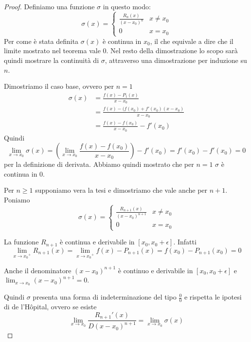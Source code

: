 \begin{proof}
Definiamo una funzione $\sigma$ in questo modo:
\begin{equation*}
\sigma(x) = \begin{cases}
\frac{R_n(x)}{(x-x_0)^n} & x \neq x_0 \\
0 & x = x_0
\end{cases}
\end{equation*}
Per come è stata definita $\sigma(x)$ è continua in $x_0$, il che equivale a dire che il limite mostrato nel teorema vale 0. Nel resto della dimostrazione lo scopo sarà quindi mostrare la continuità di $\sigma$, attraverso una dimostrazione per induzione su $n$.

Dimostriamo il caso base, ovvero per $n = 1$
\begin{align*}
\sigma(x) &= \frac{f(x)-P_1(x)}{x-x_0} \\
&= \frac{f(x)-(f(x_0)+f'(x_0)(x-x_0)}{x-x_0} \\
&= \frac{f(x)-f(x_0)}{x-x_0} - f'(x_0)
\end{align*}
Quindi
\begin{equation*}
\lim_{x \to x_0} \sigma(x) = \left(\lim_{x \to x_0} \frac{f(x)-f(x_0)}{x-x_0} \right) - f'(x_0) = f'(x_0) - f'(x_0) = 0 
\end{equation*}
per la definizione di derivata. Abbiamo quindi mostrato che per $n=1$ $\sigma$ è continua in 0.

Per $n \ge 1$ supponiamo vera la tesi e dimostriamo che vale anche per $n+1$. Poniamo
\begin{equation*}
\sigma(x) = \begin{cases}
\frac{R_{n+1}(x)}{(x-x_0)^{n+1}} & x \neq x_0 \\
0 & x = x_0
\end{cases}
\end{equation*}

La funzione $R_{n+1}$ è continua e derivabile in $[x_0, x_0 + \epsilon]$. Infatti
\begin{equation*}
\lim_{x \to {x_0}^+} R_{n+1}(x) = \lim_{x \to {x_0}^+} f(x)-P_{n+1}(x) = f(x_0) - P_{n+1}(x_0) = 0
\end{equation*}

Anche il denominatore $(x-x_0)^{n+1}$ è continuo e derivabile in $[x_0, x_0+\epsilon]$ e $\lim_{x \to x_0} (x-x_0)^{n+1} = 0$.

Quindi $\sigma$ presenta una forma di indeterminazione del tipo $\frac{0}{0}$ e rispetta le ipotesi di de l'Hôpital, ovvero se esiste
\begin{equation*}
\lim_{x \to x_0} \frac{R_{n+1}' (x)}{D(x-x_0)^{n+1}} = \lim_{x \to x_0} \sigma(x)
\end{equation*}


\end{proof}

